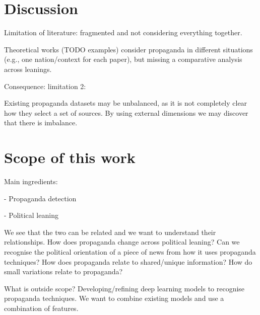 \section{\statusred Discussion}
\label{sec:lit_discussion}

Limitation of literature: fragmented and not considering everything together.

Theoretical works (TODO examples) consider propaganda in different situations (e.g., one nation/context for each paper), but missing a comparative analysis across leanings.



Consequence: limitation 2:

Existing propaganda datasets may be unbalanced, as it is not completely clear how they select a set of sources. By using external dimensions we may discover that there is imbalance.

\section{\statusred Scope of this work}
\label{sec:lit_scope}

Main ingredients:

- Propaganda detection

- Political leaning

We see that the two can be related and we want to understand their relationships.
How does propaganda change across political leaning?
Can we recognise the political orientation of a piece of news from how it uses propaganda techniques?
How does propaganda relate to shared/unique information? How do small variations relate to propaganda?

What is outside scope?
Developing/refining deep learning models to recognise propaganda techniques. We want to combine existing models and use a combination of features.

